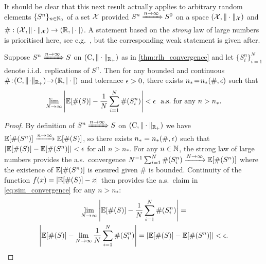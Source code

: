 It should be clear that this next result actually applies to arbitrary random elements $\{S^n\}_{n\in\mathbb{N}_0}$ of a set $\mathcal{X}$ provided $S^n\xRightarrow{n\to\infty} S^0$ on a space $(\mathcal{X},\Vert\cdot\Vert_{\mathcal{X}})$ and $\#:(\mathcal{X},\Vert\cdot\Vert_{\mathcal{X}})\to(\mathbb{R},|\cdot|)$. A statement based on the \emph{strong} law of large numbers is prioritised here, see e.g.~\cite{dekking_2005}, but the corresponding weak statement is given after.

\begin{theorem}\label{thm:conv_prices}
    Suppose $S^n\xRightarrow{n\to\infty} S$ on $(\mathrm{C},\Vert\cdot\Vert_{\mathbb{R}_+})$ as in \autoref{thm:rlh_convergence} and let $\{S_i^n\}_{i=1}^N$ denote i.i.d.~replications of $S^n$. Then for any bounded and continuous $\#\!:\!(\mathrm{C},\Vert\!\cdot\!\Vert_{\mathbb{R}_+})\!\to\!(\mathbb{R},|\cdot|)$ and tolerance $\epsilon>0$, there exists $n_*\!=\!n_*(\#,\epsilon)$ such that
    \begin{equation}\label{eq:sim_convergence}
        \lim_{N\to\infty}\left|\mathbb{E}[\#(S)] - \frac{1}{N}\sum_{i=1}^N \#(S^n_i) \right|<\epsilon\ \text{ a.s.~for any } n>n_*.
    \end{equation}
\end{theorem}
\begin{proof}
    By definition of $S^n\xRightarrow{n\to\infty} S$ on $(\mathrm{C},\Vert\cdot\Vert_{\mathbb{R}_+})$ we have $\mathbb{E}[\#(S^n)]\xrightarrow{n\to\infty}\mathbb{E}[\#(S)]$, so there exists $n_* = n_*(\#,\epsilon)$ such that $|\mathbb{E}[\#(S)] - \mathbb{E}[\#(S^n)] |<\epsilon$ for all $n>n_*$. For any $n\in\mathbb{N}$, the strong law of large numbers provides the a.s.~convergence $N^{-1}\sum_{i=1}^N \#(S^n_i)\xrightarrow{N\to\infty}\mathbb{E}[\#(S^n)]$ where the existence of $\mathbb{E}[\#(S^n)]$ is ensured given $\#$ is bounded. Continuity of the function $f(x)=|\mathbb{E}[\#(S)] - x|$ then provides the a.s.~claim in \autoref{eq:sim_convergence} for any $n>n_*$:
    \begin{multline}
        \lim_{N\to\infty}\left|\mathbb{E}[\#(S)] - \frac{1}{N}\sum_{i=1}^N \#(S^n_i) \right| =\\ \left|\mathbb{E}[\#(S)] - \lim_{N\to\infty}\frac{1}{N}\sum_{i=1}^N \#(S^n_i) \right|=|\mathbb{E}[\#(S)] - \mathbb{E}[\#(S^n)] |<\epsilon.
    \end{multline}
\end{proof}

